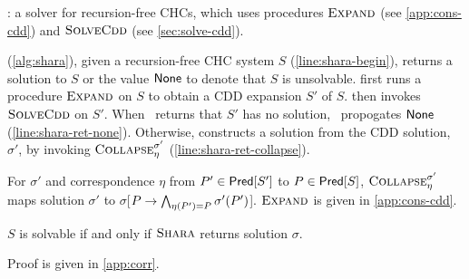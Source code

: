 \begin{algorithm}[t]
  \caption{\sys: a solver for recursion-free CHCs, which uses
    procedures $\textsc{Expand}{}$ (see \autoref{app:cons-cdd}) and
    $\textsc{SolveCdd}$ (see
    \autoref{sec:solve-cdd}). }
  \label{alg:shara}
\end{algorithm}
\sys (\autoref{alg:shara}), given a recursion-free CHC system $S$
(\autoref{line:shara-begin}), 
returns a solution
to $S$ or the value $\mathsf{None}$ to denote that $S$ is
unsolvable.
%
\sys first runs a procedure $\textsc{Expand}$ on $S$ to obtain a CDD expansion
$S'$ of $S$.
%
\sys then invokes $\textsc{SolveCdd}$ on $S'$.
%
When \solvecdd~returns that $S'$ has
no solution, \sys~propogates $\mathsf{None}$ (\autoref{line:shara-ret-none}).
%
Otherwise, \sys constructs a solution from the CDD solution, $\sigma'$, by
invoking $\textsc{Collapse}_{ \eta }^{ \sigma' }$ (\autoref{line:shara-ret-collapse}).

For $\sigma'$ and %
correspondence $\eta$ from $P' \in \mathsf{Pred}[ S' ]$ to $P \in \mathsf{Pred}[ S ]$,
$\textsc{Collapse}_{\eta}^{\sigma'}$ maps solution $\sigma'$ to
$\sigma$[$P \to \bigwedge_{ \eta(P') = P}
\sigma'(P')$].
%
$\textsc{Expand}$ is given in \autoref{app:cons-cdd}.

\begin{thm}
  \label{thm:corr}
  $S$ is solvable if and only if $\textsc{Shara}$ returns solution $\sigma$.
\end{thm}
Proof is given in \autoref{app:corr}.

